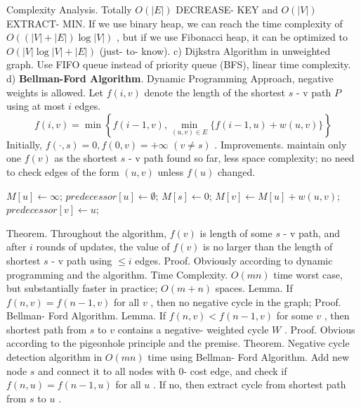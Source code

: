 \documentclass[10pt,a4paper]{article}
\begin{document}
Complexity Analysis. Totally \(O(|E|)\) DECREASE- KEY and \(O(|V|)\) EXTRACT- MIN. If we use binary heap, we can reach the time complexity of \(O((|V| + |E|)\log |V|)\) , but if we use Fibonacci heap, it can be optimized to \(O(|V|\log |V| + |E|)\) (just- to- know).
c) Dijkstra Algorithm in unweighted graph. Use FIFO queue instead of priority queue (BFS), linear time complexity.
d) \textbf{Bellman-Ford Algorithm}. Dynamic Programming Approach, negative weights is allowed.
Let \(f(i,v)\) denote the length of the shortest \(s\) - v path \(P\) using at most \(i\) edges.
\[
f(i,v) = \min \left\{f(i - 1,v),\min_{(u,v)\in E}\{f(i - 1,u) + w(u,v)\}\right\}
\]
Initially, \(f(\cdot ,s) = 0,f(0,v) = +\infty\) \((v\neq s)\) .
Improvements. maintain only one \(f(v)\) as the shortest \(s\) - v path found so far, less space complexity; no need to check edges of the form \((u,v)\) unless \(f(u)\) changed.
\begin{algorithm}
\caption{Bellman-Ford Algorithm}
\begin{algorithmic}[1]
    \State \(M[u] \leftarrow \infty\);
    \State \(predecessor[u] \leftarrow \emptyset\);
\EndFor
\State \(M[s] \leftarrow 0\);
                    \State \(M[v] \leftarrow M[u] + w(u,v)\);
                    \State \(predecessor[v] \leftarrow u\);
                \EndIf
            \EndFor
        \EndIf
    \EndFor
\EndFor
\end{algorithmic}
\end{algorithm}
Theorem. Throughout the algorithm, \(f(v)\) is length of some \(s\) - v path, and after \(i\) rounds of updates, the value of \(f(v)\) is no larger than the length of shortest \(s\) - v path using \(\leq i\) edges.
Proof. Obviously according to dynamic programming and the algorithm.
Time Complexity. \(O(mn)\) time worst case, but substantially faster in practice; \(O(m + n)\) spaces.
Lemma. If \(f(n,v) = f(n - 1,v)\) for all \(v\) , then no negative cycle in the graph;
Proof. Bellman- Ford Algorithm.
Lemma. If \(f(n,v)< f(n - 1,v)\) for some \(v\) , then shortest path from \(s\) to \(v\) contains a negative- weighted cycle \(W\) .
Proof. Obvious according to the pigeonhole principle and the premise.
Theorem. Negative cycle detection algorithm in \(O(mn)\) time using Bellman- Ford Algorithm. Add new node \(s\) and connect it to all nodes with 0- cost edge, and check if \(f(n,u) = f(n - 1,u)\) for all \(u\) . If no, then extract cycle from shortest path from \(s\) to \(u\) .
\end{document}

